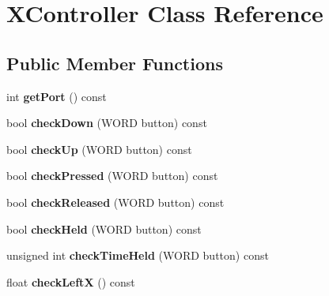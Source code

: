 \hypertarget{class_x_controller}{}\section{X\+Controller Class Reference}
\label{class_x_controller}
\subsection*{Public Member Functions}
\begin{DoxyCompactItemize}
\item 
\hypertarget{class_x_controller_a148116f8235dd69b17f10c09ebc8e493}{}int {\bfseries get\+Port} () const \label{class_x_controller_a148116f8235dd69b17f10c09ebc8e493}

\item 
\hypertarget{class_x_controller_af065f53794859ac0664106a5ff024ef7}{}bool {\bfseries check\+Down} (W\+O\+R\+D button) const \label{class_x_controller_af065f53794859ac0664106a5ff024ef7}

\item 
\hypertarget{class_x_controller_a8f62325ebebceea3c56b164faf9c05cb}{}bool {\bfseries check\+Up} (W\+O\+R\+D button) const \label{class_x_controller_a8f62325ebebceea3c56b164faf9c05cb}

\item 
\hypertarget{class_x_controller_a1cc805edbaecf773f97bfcdbc77a2c4f}{}bool {\bfseries check\+Pressed} (W\+O\+R\+D button) const \label{class_x_controller_a1cc805edbaecf773f97bfcdbc77a2c4f}

\item 
\hypertarget{class_x_controller_a35587b82880720ea2b265d7a7d712190}{}bool {\bfseries check\+Released} (W\+O\+R\+D button) const \label{class_x_controller_a35587b82880720ea2b265d7a7d712190}

\item 
\hypertarget{class_x_controller_aa768bc43116edb8d33ffd4bc83f977fd}{}bool {\bfseries check\+Held} (W\+O\+R\+D button) const \label{class_x_controller_aa768bc43116edb8d33ffd4bc83f977fd}

\item 
\hypertarget{class_x_controller_ad8241a72453c9036b014e6c756bc4468}{}unsigned int {\bfseries check\+Time\+Held} (W\+O\+R\+D button) const \label{class_x_controller_ad8241a72453c9036b014e6c756bc4468}

\item 
\hypertarget{class_x_controller_a62f462d73f5264a0cb468c8d7b3e9da0}{}float {\bfseries check\+Left\+X} () const \label{class_x_controller_a62f462d73f5264a0cb468c8d7b3e9da0}


\end{DoxyCompactItemize}
